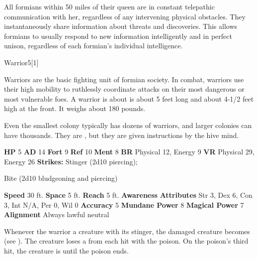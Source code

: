         All formians within 50 miles of their queen are in constant telepathic communication with her, regardless of any intervening physical obstacles.
        They instantaneously share information about threats and discoveries.
        This allows formians to usually respond to new information intelligently and in perfect unison, regardless of each formian's individual intelligence.
  

  \begin{monsubsection}{Warrior}{5}[1]
    \vspace{-1em}\vspace{-1em}
    \vspace{0em}

    
          Warriors are the basic fighting unit of formian society.
          In combat, warriors use their high mobility to ruthlessly coordinate attacks on their most dangerous or most vulnerable foes.
          A warrior is about is about 5 feet long and about 4-1/2 feet high at the front.
          It weighs about 180 pounds.
        
          Even the smallest colony typically has dozens of warriors, and larger colonies can have thousands.
          They are , but they are given instructions by the hive mind.
        

    \begin{spellcontent}
      \begin{spelltargetinginfo}
        \pari \textbf{HP} 5 \monsep
          \textbf{AD} 14 \monsep
          \textbf{Fort} 9 \monsep
          \textbf{Ref} 10 \monsep
          \textbf{Ment} 8
        \pari \textbf{BR} Physical 12, Energy 9 \monsep
        \textbf{VR} Physical 29, Energy 26
        \pari \textbf{Strikes:}
            Stinger  (2d10 piercing);
\par Bite  (2d10 bludgeoning and piercing)
      \end{spelltargetinginfo}
    \end{spellcontent}
    \begin{monsterfooter}
      \pari \textbf{Speed} 30 ft. \monsep
        \textbf{Space} 5 ft. \monsep
        \textbf{Reach} 5 ft.
      \pari \textbf{Awareness} 
      \pari \textbf{Attributes}
        Str 3, Dex 6,
        Con 3, Int N/A,
        Per 0, Wil 0
      \pari \textbf{Accuracy} 5 \monsep
        \textbf{Mundane Power} 8 \monsep
      \textbf{Magical Power} 7
      \pari \textbf{Alignment} Always lawful neutral
    \end{monsterfooter}
  \end{monsubsection}
            Whenever the warrior  a creature with its stinger, the damaged creature becomes  (see ).
            The creature loses a  from each hit with the poison.
            On the poison's third hit, the creature is  until the poison ends.
  
